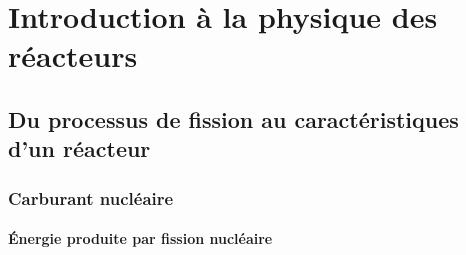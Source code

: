 \chapter{Introduction à la physique des réacteurs}
\section{Du processus de fission au caractéristiques d'un réacteur}
\subsection{Carburant nucléaire}
\subsubsection{Énergie produite par fission nucléaire}

